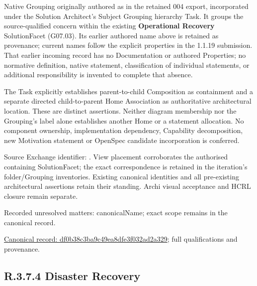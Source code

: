 Native Grouping originally authored as \texttt{} in the retained 004 export,
incorporated under the Solution Architect's Subject Grouping hierarchy Task.
It groups the source-qualified \texttt{} concern within
the existing \textbf{Operational Recovery} SolutionFacet (G07.03). Its earlier authored name above is retained as provenance; current names
follow the explicit properties in the 1.1.19 submission.
That earlier incoming record has no Documentation or authored Properties; no normative
definition, native statement, classification of individual statements, or
additional responsibility is invented to complete that absence.



The Task explicitly establishes parent-to-child Composition as containment and
a separate directed child-to-parent Home Association as authoritative architectural
location. These are distinct assertions. Neither diagram membership nor the
Grouping's label alone establishes another Home or a statement allocation.
No component ownership, implementation dependency, Capability decomposition,
new Motivation statement or OpenSpec candidate incorporation is conferred.



Source Exchange identifier: \texttt{}. View placement corroborates
the authorised containing SolutionFacet; the exact correspondence is retained in the
iteration's folder/Grouping inventories. Existing canonical identities and all
pre-existing architectural assertions retain their standing. Archi visual
acceptance and HCRL closure remain separate.


{\small Recorded unresolved matters: canonicalName; exact scope remains in the canonical record.}\par
{\footnotesize \href{../../../../../../../continuum/grouping/df0b38c3ba9c49ea8dfe3f032ad2a329.md}{Canonical record: df0b38c3ba9c49ea8dfe3f032ad2a329}; full qualifications and provenance.}\par
\subsection*{R.3.7.4 Disaster Recovery}
\label{navigation:R.3.7.4}

